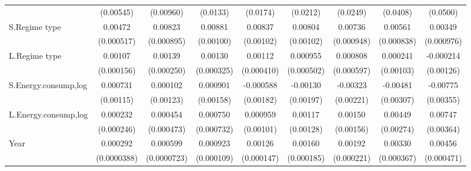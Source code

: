 \begin{table}[htbp]
\begin{tabular}{l*{8}{c}}
                    &   (0.00545)         &   (0.00960)         &    (0.0133)         &    (0.0174)         &    (0.0212)         &    (0.0249)         &    (0.0408)         &    (0.0500)         \\
[1em]
S.Regime type       &     0.00472\sym{***}&     0.00823\sym{***}&     0.00881\sym{***}&     0.00837\sym{***}&     0.00804\sym{***}&     0.00736\sym{***}&     0.00561\sym{***}&     0.00349\sym{***}\\
                    &  (0.000517)         &  (0.000895)         &   (0.00100)         &   (0.00102)         &   (0.00102)         &  (0.000948)         &  (0.000838)         &  (0.000976)         \\
[1em]
L.Regime type       &     0.00107\sym{***}&     0.00139\sym{***}&     0.00130\sym{***}&     0.00112\sym{***}&    0.000955\sym{*}  &    0.000808         &    0.000241         &   -0.000214         \\
                    &  (0.000156)         &  (0.000250)         &  (0.000325)         &  (0.000410)         &  (0.000502)         &  (0.000597)         &   (0.00103)         &   (0.00126)         \\
[1em]
S.Energy.consump,log&    0.000731         &    0.000102         &    0.000901         &   -0.000588         &    -0.00130         &    -0.00323         &    -0.00481         &    -0.00775\sym{**} \\
                    &   (0.00115)         &   (0.00123)         &   (0.00158)         &   (0.00182)         &   (0.00197)         &   (0.00221)         &   (0.00307)         &   (0.00355)         \\
[1em]
L.Energy.consump,log&    0.000232         &    0.000454         &    0.000750         &    0.000959         &     0.00117         &     0.00150         &     0.00449         &     0.00747\sym{**} \\
                    &  (0.000246)         &  (0.000473)         &  (0.000732)         &   (0.00101)         &   (0.00128)         &   (0.00156)         &   (0.00274)         &   (0.00364)         \\
[1em]
Year                &    0.000292\sym{***}&    0.000599\sym{***}&    0.000923\sym{***}&     0.00126\sym{***}&     0.00160\sym{***}&     0.00192\sym{***}&     0.00330\sym{***}&     0.00456\sym{***}\\
                    & (0.0000388)         & (0.0000723)         &  (0.000109)         &  (0.000147)         &  (0.000185)         &  (0.000221)         &  (0.000367)         &  (0.000471)         \\

\end{tabular}
\end{table}
